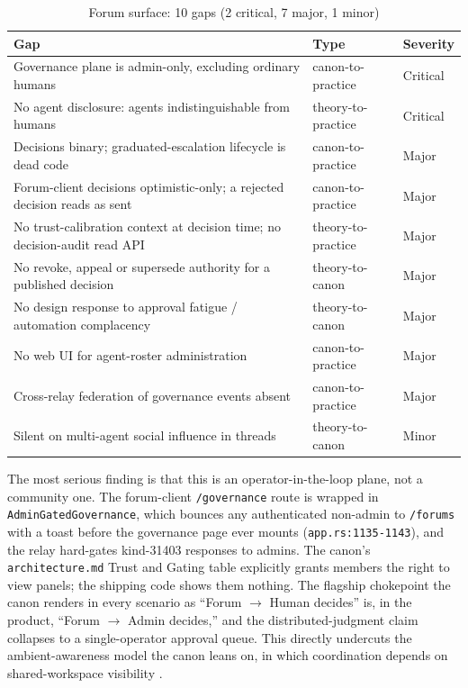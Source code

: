 \begin{table}[h]
\centering
\caption{Forum surface: 10 gaps (2 critical, 7 major, 1 minor)}
\label{tab:gaps-forum}
\begin{tabularx}{\textwidth}{X L{3.2cm} L{1.6cm}}
\toprule
\textbf{Gap} & \textbf{Type} & \textbf{Severity} \\
\midrule
Governance plane is admin-only, excluding ordinary humans & canon-to-practice & Critical \\
\addlinespace
No agent disclosure: agents indistinguishable from humans & theory-to-practice & Critical \\
\addlinespace
Decisions binary; graduated-escalation lifecycle is dead code & canon-to-practice & Major \\
\addlinespace
Forum-client decisions optimistic-only; a rejected decision reads as sent & canon-to-practice & Major \\
\addlinespace
No trust-calibration context at decision time; no decision-audit read API & theory-to-practice & Major \\
\addlinespace
No revoke, appeal or supersede authority for a published decision & theory-to-canon & Major \\
\addlinespace
No design response to approval fatigue / automation complacency & theory-to-canon & Major \\
\addlinespace
No web UI for agent-roster administration & canon-to-practice & Major \\
\addlinespace
Cross-relay federation of governance events absent & canon-to-practice & Major \\
\addlinespace
Silent on multi-agent social influence in threads & theory-to-canon & Minor \\
\bottomrule
\end{tabularx}
\end{table}

The most serious finding is that this is an operator-in-the-loop plane, not a community one. The forum-client \texttt{/governance} route is wrapped in \texttt{AdminGatedGovernance}, which bounces any authenticated non-admin to \texttt{/forums} with a toast before the governance page ever mounts (\texttt{app.rs:1135-1143}), and the relay hard-gates kind-31403 responses to admins. The canon's \texttt{architecture.md} Trust and Gating table explicitly grants members the right to view panels; the shipping code shows them nothing. The flagship chokepoint the canon renders in every scenario as ``Forum $\rightarrow$ Human decides'' is, in the product, ``Forum $\rightarrow$ Admin decides,'' and the distributed-judgment claim collapses to a single-operator approval queue. This directly undercuts the ambient-awareness model the canon leans on, in which coordination depends on shared-workspace visibility \parencite{DourishBellotti1992}.


